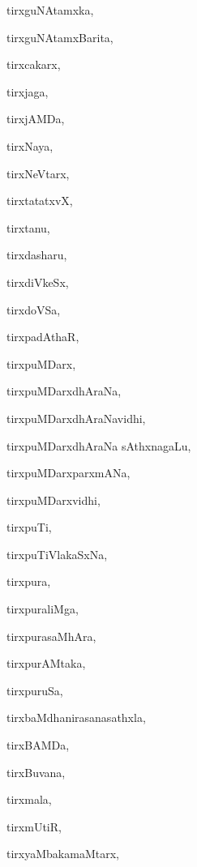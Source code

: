 \begin{multicols}{2}
{tirxguNAtamxka}, \pageref{tirxguNAtamxka}

{tirxguNAtamxBarita}, \pageref{tirxguNAtamxBarita}

{tirxcakarx}, \pageref{tirxcakarx}

{tirxjaga}, \pageref{tirxjaga}

{tirxjAMDa}, \pageref{tirxjAMDa}

{tirxNaya}, \pageref{tirxNaya}

{tirxNeVtarx}, \pageref{tirxNeVtarx}

{tirxtatatxvX}, \pageref{tirxtatatxvX}

{tirxtanu}, \pageref{tirxtanu}

{tirxdasharu}, \pageref{tirxdasharu}

{tirxdiVkeSx}, \pageref{tirxdiVkeSx}

{tirxdoVSa}, \pageref{tirxdoVSa}

{tirxpadAthaR}, \pageref{tirxpadAthaR}

{tirxpuMDarx}, \pageref{tirxpuMDarx}

{tirxpuMDarxdhAraNa}, \pageref{tirxpuMDarxdhAraNa}

{tirxpuMDarxdhAraNavidhi}, \pageref{tirxpuMDarxdhAraNavidhi}

{tirxpuMDarxdhAraNa sAthxna\-gaLu}, \pageref{tirxpuMDarxdhAraNa sAthxnagaLu}

{tirxpuMDarxparxmANa}, \pageref{tirxpuMDarxparxmANa}

{tirxpuMDarxvidhi}, \pageref{tirxpuMDarxvidhi}

{tirxpuTi}, \pageref{tirxpuTi}

{tirxpuTiVlakaSxNa}, \pageref{tirxpuTiVlakaSxNa}

{tirxpura}, \pageref{tirxpura}

{tirxpuraliMga}, \pageref{tirxpuraliMga}

{tirxpurasaMhAra}, \pageref{tirxpurasaMhAra}

{tirxpurAMtaka}, \pageref{tirxpurAMtaka}

{tirxpuruSa}, \pageref{tirxpuruSa}

{tirxbaMdhanirasanasathxla}, \pageref{tirxbaMdhanirasanasathxla}

{tirxBAMDa}, \pageref{tirxBAMDa}

{tirxBuvana}, \pageref{tirxBuvana}

{tirxmala}, \pageref{tirxmala}

{tirxmUtiR}, \pageref{tirxmUtiR}

{tirxyaMbakamaMtarx}, \pageref{tirxyaMbakamaMtarx}


\end{multicols}
